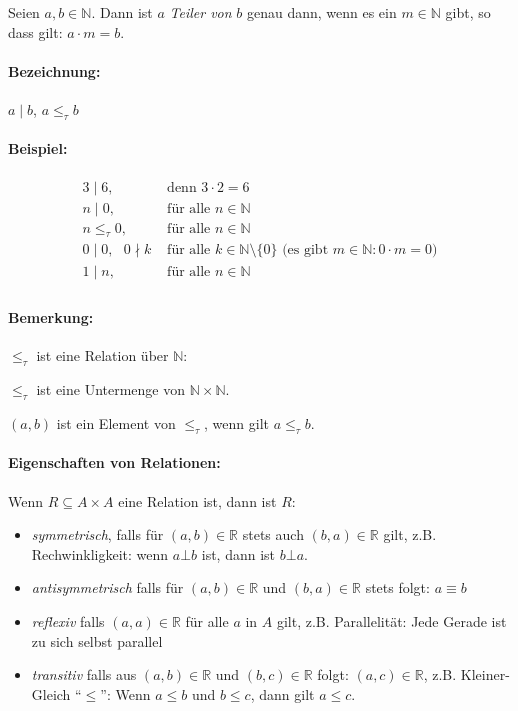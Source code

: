 
Seien $a, b \in \mathbb{N}$. Dann ist $a$ \emph{Teiler von} $b$ genau dann, wenn
es ein $m \in \mathbb{N}$ gibt, so dass gilt: $a \cdot m = b$.

\paragraph{Bezeichnung:} $a \mid b$, $a \le_\tau b$

\paragraph{Beispiel:}
\begin{align*}
3 \mid 6,                    & \text{ denn }     3 \cdot 2 = 6    \\
n \mid 0,                    & \text{ für alle } n \in \mathbb{N} \\
n \le_\tau 0,                 & \text{ für alle } n \in \mathbb{N} \\
0 \mid 0, \text{ } 0 \nmid k & \text{ für alle } k \in \mathbb{N} \setminus \{0\} \text{ (es gibt }  m \in \mathbb{N}: 0 \cdot m = 0 \text{)} \\
1 \mid n,                    & \text{ für alle } n \in \mathbb{N} \\
\end{align*}

\paragraph{Bemerkung:}
$\le_\tau$ ist eine Relation über $\mathbb{N}$:

$\le_\tau $ ist eine Untermenge von $\mathbb{N} \times \mathbb{N}$.

$(a,b) $ ist ein Element von $\le_\tau$, wenn gilt $a \le_\tau b$.

\paragraph{Eigenschaften von Relationen:}

Wenn $R \subseteq A \times A$ eine Relation ist, dann ist $R$:
\begin{itemize}
\item \emph{symmetrisch}, falls für $(a, b) \in \mathbb{R}$ stets auch
  $(b, a) \in \mathbb{R}$ gilt, z.B. Rechwinkligkeit: wenn $a \bot b$ ist,
  dann ist $b \bot a$.
 \item \emph{antisymmetrisch} falls für $(a, b) \in \mathbb{R}$ und $(b, a) \in \mathbb{R}$  stets folgt: $a \equiv b$
 \item \emph{reflexiv} falls $(a, a) \in \mathbb{R}$ für alle $a$ in
   $A$ gilt, z.B. Parallelität: Jede Gerade ist zu sich selbst parallel
 \item \emph{transitiv} falls aus $(a, b) \in \mathbb{R}$ und $(b, c)
   \in \mathbb{R}$ folgt: $(a, c) \in \mathbb{R}$, z.B. Kleiner-Gleich
   ``$\leq$'': Wenn $a \leq b$ und $b \leq c$, dann gilt $a \leq c$.
\end{itemize}


